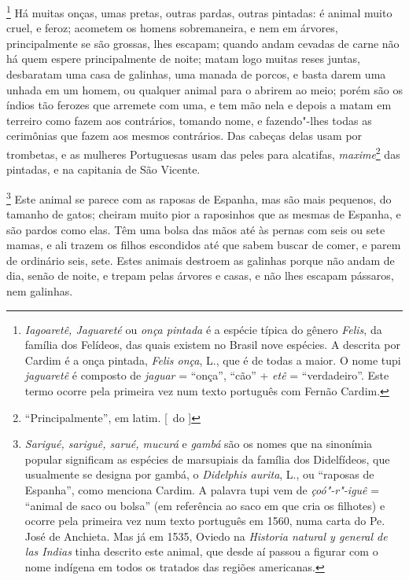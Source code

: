 \begin{linenumbers}
\footnote{ \textit{Iagoaretê, Jaguareté} ou
\textit{onça pintada } é a espécie típica do gênero \textit{Felis}, da
família dos Felídeos, das quais existem no Brasil nove espécies. A
descrita por Cardim é a onça pintada, \textit{Felis onça}, L., que é de
todas a maior. O nome tupi \textit{jaguaretê} é composto de
\textit{jaguar} = ``onça'', ``cão'' + \textit{etê} = ``verdadeiro''. Este
termo ocorre pela primeira vez num texto português com Fernão Cardim.} 
Há muitas onças, umas pretas, outras pardas, outras pintadas: é animal
muito cruel, e feroz; acometem os homens sobremaneira, e nem em
árvores, principalmente se são grossas, lhes escapam; quando andam
cevadas de carne não há quem espere principalmente de noite; matam logo
muitas reses juntas, desbaratam uma casa de galinhas, uma manada de
porcos, e basta darem uma unhada em um homem, ou qualquer animal para o
abrirem ao meio; porém são os índios tão ferozes que arremete com uma,
e tem mão nela e depois a matam em terreiro como fazem aos contrários,
tomando nome, e fazendo"-lhes todas as cerimônias que fazem aos mesmos
contrários. Das cabeças delas usam por trombetas, e as mulheres
Portuguesas usam das peles para alcatifas, \textit{maxime}\footnote{ ``Principalmente'', em latim. [~do ]} das pintadas, e na
capitania de São Vicente.

\footnote{ \textit{Sarigué, sariguê, sarué,
mucurá} e \textit{gambá} são os nomes que na sinonímia popular
significam as espécies de marsupiais da família dos Didelfídeos, que
usualmente se designa por gambá, o \textit{Didelphis aurita}, 
L., ou ``raposas de Espanha'', como menciona Cardim. A
palavra tupi vem de \textit{çoó"-r"-iguê} = ``animal de saco ou bolsa'' 
(em referência ao saco em que cria os filhotes) e ocorre pela primeira
vez num texto português em 1560, numa carta do Pe. José de
Anchieta. Mas já em 1535, Oviedo na \textit{Historia natural y general
de las Indias} tinha descrito este animal, que desde aí passou a
figurar com o nome indígena em todos os tratados das regiões
americanas.} Este animal se parece com as raposas de Espanha,
mas são mais pequenos, do tamanho de gatos; cheiram muito pior a
raposinhos que as mesmas de Espanha, e são pardos como elas. Têm uma
bolsa das mãos até às pernas com seis ou sete mamas, e ali trazem os
filhos escondidos até que sabem buscar de comer, e parem de ordinário
seis, sete. Estes animais destroem as galinhas porque não andam de dia,
senão de noite, e trepam pelas árvores e casas, e não lhes escapam
pássaros, nem galinhas. 


\end{linenumbers}

